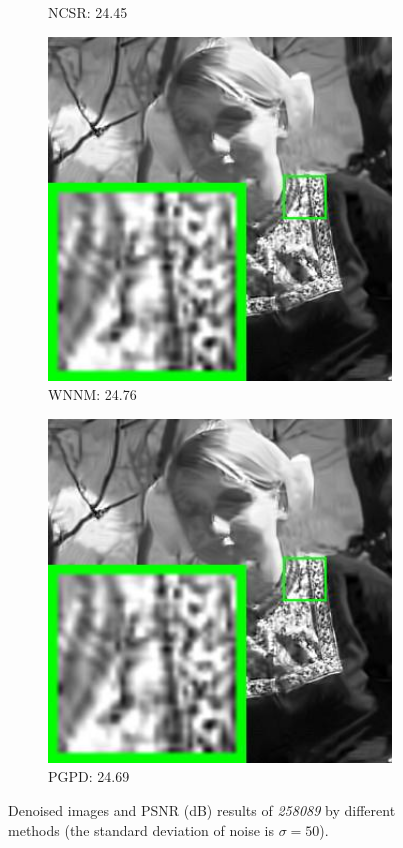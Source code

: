 \begin{figure}
\begin{subfigure}[t]{0.24\textwidth}
		\caption{NCSR: 24.45}
    \end{subfigure}
    \hfill
    \begin{subfigure}[t]{0.24\textwidth}
        \centering
        \includegraphics[width=1\textwidth]{images/pgpd/200img/br_our_50_258089.jpg}
		\caption{WNNM: 24.76}
    \end{subfigure}
    \hfill
    \begin{subfigure}[t]{0.24\textwidth}
        \centering
        \includegraphics[width=1\textwidth]{images/pgpd/200img/br_our_50_258089.jpg}
		\caption{PGPD: 24.69}
    \end{subfigure}
    \caption{Denoised images and PSNR (dB) results of \textsl{258089} by different methods (the standard deviation of noise is $\sigma=50$).}
    \label{fig2-16}
\end{figure}

